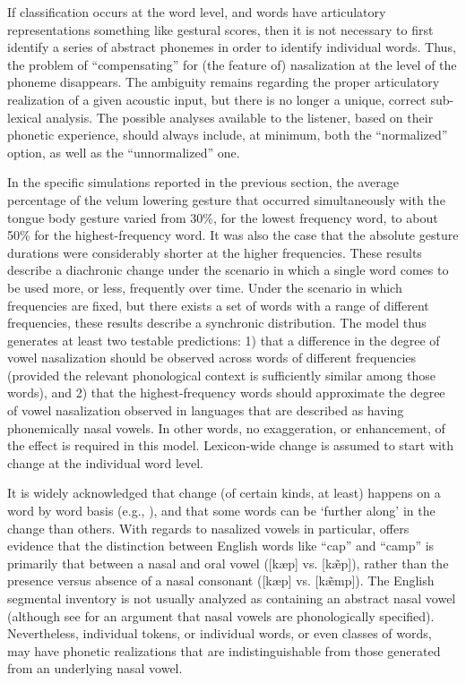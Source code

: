 If classification occurs at the word level, and words have articulatory
representations something like gestural scores, then it is not necessary
to first identify a series of abstract phonemes in order to identify
individual words. Thus, the problem of “compensating” for (the
feature of) nasalization at the level of the phoneme disappears. The
ambiguity remains regarding the proper articulatory realization of
a given acoustic input, but there is no longer a unique, correct sub-lexical
analysis. The possible analyses available to the listener, based on
their phonetic experience, should always include, at minimum, both
the “normalized” option, as well as the “unnormalized”
one.

In the specific simulations reported in the previous section, the
average percentage of the velum lowering gesture that occurred simultaneously
with the tongue body gesture varied from 30\%, for the lowest frequency
word, to about 50\% for the highest-frequency word. It was also the
case that the absolute gesture durations were considerably shorter
at the higher frequencies. These results describe a diachronic change
under the scenario in which a single word comes to be used more, or
less, frequently over time. Under the scenario in which frequencies
are fixed, but there exists a set of words with a range of different
frequencies, these results describe a synchronic distribution. The
model thus generates at least two testable predictions: 1) that a
difference in the degree of vowel nasalization should be observed
across words of different frequencies (provided the relevant phonological
context is sufficiently similar among those words), and 2) that the
highest-frequency words should approximate the degree of vowel nasalization
observed in languages that are described as having phonemically nasal
vowels. In other words, no exaggeration, or enhancement, of the effect
is required in this model. Lexicon-wide change is assumed to start
with change at the individual word level.

It is widely acknowledged that change (of certain kinds, at least)
happens on a word by word basis (e.g., \citealt{Phillips1984,Bybee2002,Pierrehumbert2002}),
and that some words can be `further along' in the change than others.
With regards to nasalized vowels in particular, \citet{malecot1960vowel}
offers evidence that the distinction between English words like “cap”
and “camp” is primarily that between a nasal and oral vowel
({[kæp]} vs. {[kæ̃p]}), rather than the presence
versus absence of a nasal consonant ({[kæp]} vs. {[kæ̃mp]}).
The English segmental inventory is not usually analyzed as containing
an abstract nasal vowel (although see \citet{Sole1992} for an argument
that nasal vowels are phonologically specified). Nevertheless, individual
tokens, or individual words, or even classes of words, may have phonetic
realizations that are indistinguishable from those generated from
an underlying nasal vowel. 
